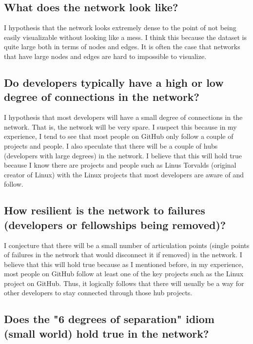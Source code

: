 \documentclass[9pt,twocolumn,twoside]{pnas-new}
\begin{document}
\subsection*{What does the network look like?}

I hypothesis that the network looks extremely dense to the point of not being easily visualizable without looking like a mess. I think this because the dataset is quite large both in terms of nodes and edges. It is often the case that networks that have large nodes and edges are hard to impossible to visualize.

\subsection*{Do developers typically have a high or low degree of connections in the network?}

I hypothesis that most developers will have a small degree of connections in the network. That is, the network will be very spare. I suspect this because in my experience, I tend to see that most people on GitHub only follow a couple of projects and people. I also speculate that there will be a couple of hubs (developers with large degrees) in the network. I believe that this will hold true because I know there are projects and people such as Linus Torvalds (original creator of Linux) with the Linux projects that most developers are aware of and follow. 

\subsection*{How resilient is the network to failures (developers or fellowships being removed)?}

I conjecture that there will be a small number of articulation points (single points of failures in the network that would disconnect it if removed) in the network. I believe that this will hold true because as I mentioned before, in my experience, most people on GitHub follow at least one of the key projects such as the Linux project on GitHub. Thus, it logically follows that there will usually be a way for other developers to stay connected through those hub projects.

\subsection*{Does the "6 degrees of separation" idiom (small world) hold true in the network?}
\end{document}
